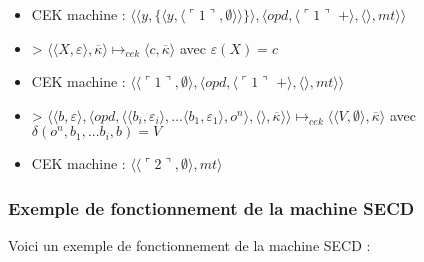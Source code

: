\documentclass[10pt,a4paper]{article}
\begin{document}
\begin{itemize}
					\item[] CEK machine : $\langle\langle y,\{\langle y,\langle\ulcorner 1\urcorner,\emptyset\rangle\rangle\}\rangle,\langle opd,\langle\ulcorner 1\urcorner$ $+\rangle,\langle\rangle,mt\rangle\rangle$
					\item[] > $\langle\langle X,\varepsilon\rangle,\overline{\kappa}\rangle \longmapsto_{cek} \langle c,\overline{\kappa}\rangle$ avec $\varepsilon(X) = c$
					\item[] CEK machine : $\langle\langle\ulcorner 1\urcorner,\emptyset\rangle,\langle opd,\langle\ulcorner 1\urcorner$ $+\rangle,\langle\rangle,mt\rangle\rangle$
					\item[] > $\langle  \langle b,\varepsilon\rangle,\langle opd,\langle \langle b_{i},\varepsilon_{i}\rangle,...\langle b_{1},\varepsilon_{1}\rangle ,o^{n}\rangle,\langle\rangle,\overline{\kappa}\rangle\rangle \longmapsto_{cek} \langle \langle V,\emptyset\rangle,\overline{\kappa}\rangle$ avec $\delta(o^{n},b_{1},...b_{i},b) = V$
					\item[] CEK machine : $\langle\langle\ulcorner 2\urcorner,\emptyset\rangle,mt\rangle$
				\end{itemize}
				\newpage
			
			
				
			\subsubsection{Exemple de fonctionnement de la machine SECD}\label{SECD}
				
				Voici un exemple de fonctionnement de la machine SECD :	
					
\end{document}
